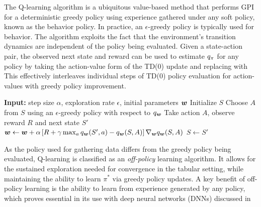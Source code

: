   The Q-learning algorithm  is a ubiquitous value-based method that performs GPI for a deterministic greedy policy using experience gathered under any soft policy, known as the behavior policy. In practice, an $\epsilon$-greedy policy is typically used for behavior. The algorithm 
  exploits the fact that the environment's transition dynamics are independent of the policy being evaluated. Given a state-action pair, the observed next state and reward can be used to estimate $q_{\pi}$ for any policy by taking the action-value form of the TD(0) update 
  and replacing %
  with %
  This effectively interleaves individual steps of TD(0) policy evaluation for action-values with greedy policy improvement.
  
  \begin{algorithm}[t]
  \caption{Q-learning}
  \label{alg:qlearning}
  \begin{algorithmic}[1]
  \State \textbf{Input:} step size $\alpha$, exploration rate $\epsilon$, initial parameters ${\bm w}$
      \State Initialize $S$
          \State Choose $A$ from $S$ using an $\epsilon$-greedy policy with respect to $q_{\bm w}$
          \State Take action $A$, observe reward $R$ and next state $S'$
          \State ${\bm w} \gets {\bm w} + \alpha \left[ R + \gamma \max_{a} q_{\bm w}(S', a) - q_{\bm w}(S, A) \right] \nabla_{{\bm w}} q_{\bm w}(S, A)$ 
          \State $S \gets S'$
      \EndWhile
  \EndFor
  \end{algorithmic}
  \end{algorithm}
  
  As the policy used for gathering data differs from the greedy policy being evaluated, Q-learning is classified as an \textit{off-policy} learning algorithm. It allows for the sustained exploration needed for convergence in the tabular setting, while maintaining the ability to learn $\pi^*$ via greedy policy updates. A key benefit of off-policy learning is the ability to learn from experience generated by any policy, which proves essential in its use with deep neural networks (DNNs) discussed in %
  
